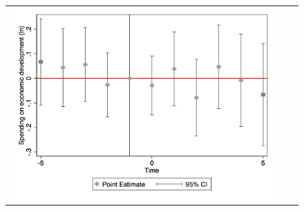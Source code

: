 \begin{figure}[ht]
\begin{tabular}{@{}ccc@{}}
\begin{minipage}[t]{0.32\textwidth}
            \includegraphics[width=\linewidth]{images/eventdd_ln_q4_11_step1.jpg}
            \label{fig:ecodev}
        \end{minipage} \\[10pt]


\end{tabular}
\end{figure}
